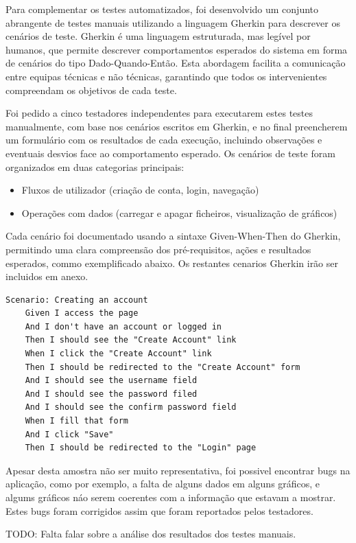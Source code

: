 Para complementar os testes automatizados, foi desenvolvido um conjunto abrangente de testes manuais utilizando a linguagem Gherkin para descrever os cenários de teste. Gherkin é uma linguagem estruturada, mas legível por humanos, que permite descrever comportamentos esperados do sistema em forma de cenários do tipo Dado-Quando-Então. Esta abordagem facilita a comunicação entre equipas técnicas e não técnicas, garantindo que todos os intervenientes compreendam os objetivos de cada teste.

Foi pedido a cinco testadores independentes para executarem estes testes manualmente, com base nos cenários escritos em Gherkin, e no final preencherem um formulário com os resultados de cada execução, incluindo observações e eventuais desvios face ao comportamento esperado. Os cenários de teste foram organizados em duas categorias principais:

\begin{itemize}
    \item Fluxos de utilizador (criação de conta, login, navegação)
    \item Operações com dados (carregar e apagar ficheiros, visualização de gráficos)
\end{itemize}

Cada cenário foi documentado usando a sintaxe Given-When-Then do Gherkin, permitindo uma clara compreensão dos pré-requisitos, ações e resultados esperados, commo exemplificado abaixo. Os restantes cenarios Gherkin irão ser incluidos em anexo.

\begin{verbatim}
Scenario: Creating an account
	Given I access the page 
	And I don't have an account or logged in
	Then I should see the "Create Account" link
	When I click the "Create Account" link
	Then I should be redirected to the "Create Account" form
	And I should see the username field
	And I should see the password filed
	And I should see the confirm password field
	When I fill that form
	And I click "Save"
	Then I should be redirected to the "Login" page
\end{verbatim}


Apesar desta amostra não ser muito representativa, foi possivel encontrar bugs na aplicação, como por exemplo, a falta de alguns dados em alguns gráficos, e algums gráficos náo serem coerentes com a informação que estavam a mostrar. Estes bugs foram corrigidos assim que foram reportados pelos testadores.

TODO: Falta falar sobre a análise dos resultados dos testes manuais.

